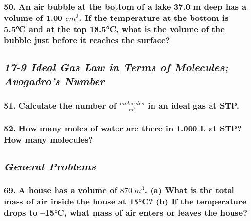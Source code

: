 \documentclass{article}
\begin{document}
\subsubsection*{
    50. An air bubble at the bottom of a lake 37.0 m deep has a volume of
    1.00 $cm^3$. If the temperature at the bottom is 5.5°C and at the top
    18.5°C, what is the volume of the bubble just before it reaches the surface?
}
\begin{center}
    \subsection*{\textbf{\textit{17-9 Ideal Gas Law in Terms of Molecules;
    Avogadro's Number}}}
\end{center}
\subsubsection*{
    51. Calculate the number of $\frac{molecules}{m^3}$ in an ideal gas at STP.
}
\subsubsection*{
    52. How many moles of water are there in 1.000 L at STP? How many molecules?
}
\newpage
\begin{center}
    \subsection*{\textbf{\textit{General Problems}}}
\end{center}
\subsubsection*{
    69. A house has a volume of $870\;m^3$. (a) What is the total mass of air inside
    the house at 15°C? (b) If the temperature drops to –15°C, what mass of air
    enters or leaves the house?
}
\end{document}
